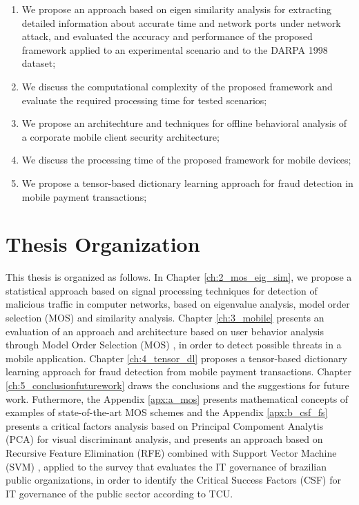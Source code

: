\begin{enumerate}
	\item We propose an approach based on eigen similarity analysis for extracting detailed information about accurate time and network ports under network attack, and evaluated the accuracy and performance of the proposed framework applied to an experimental scenario and to the DARPA 1998 dataset;
	\item We discuss the computational complexity of the proposed framework and evaluate the required processing time for tested scenarios;
	\item We propose an architechture and techniques for offline behavioral analysis of a corporate mobile client security architecture;
	\item We discuss the processing time of the proposed framework for mobile devices;
	\item We propose a tensor-based dictionary learning approach for fraud detection in mobile payment transactions;
\end{enumerate}

\section{Thesis Organization}
\label{sc:organization}

This thesis is organized as follows. In Chapter \ref{ch:2_mos_eig_sim}, we propose a statistical approach based on signal processing techniques for detection of malicious traffic in computer networks, based on eigenvalue analysis, model order selection (MOS) and similarity analysis. Chapter \ref{ch:3_mobile} presents an evaluation of an approach and architecture based on user behavior analysis through Model Order Selection (MOS) \cite{tenorio2013greatest}, in order to detect possible threats in a mobile application. Chapter \ref{ch:4_tensor_dl} proposes a tensor-based dictionary learning approach for fraud detection from mobile payment transactions. Chapter \ref{ch:5_conclusionfuturework} draws the conclusions and the suggestions for future work. Futhermore, the Appendix \ref{apx:a_mos} presents mathematical concepts of examples of state-of-the-art MOS schemes and the Appendix \ref{apx:b_csf_fs} presents a critical factors analysis based on Principal Compoment Analytis (PCA) for visual discriminant analysis, and presents an approach based on Recursive Feature Elimination (RFE) combined with Support Vector Machine (SVM) \cite{hearst1998support}, applied to the survey that evaluates the IT governance of brazilian public organizations, in order to identify the Critical Success Factors (CSF) for IT governance of the public sector according to TCU.